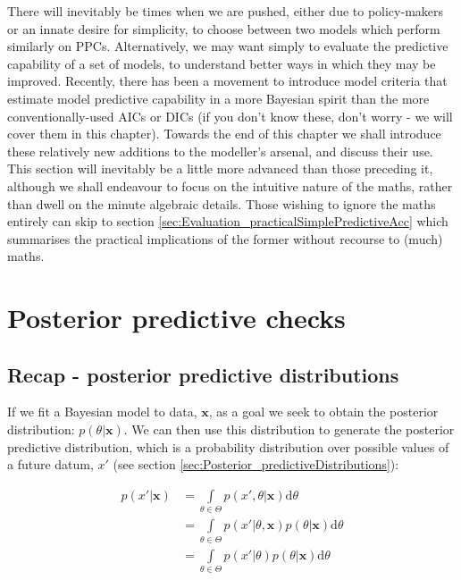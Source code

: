 \documentclass[11pt,fullpage]{book}
\begin{document}
There will inevitably be times when we are pushed, either due to policy-makers or an innate desire for simplicity, to choose between two models which perform similarly on PPCs. Alternatively, we may want simply to evaluate the predictive capability of a set of models, to understand better ways in which they may be improved. Recently, there has been a movement to introduce model criteria that estimate model predictive capability in a more Bayesian spirit than the more conventionally-used AICs or DICs (if you don't know these, don't worry - we will cover them in this chapter). Towards the end of this chapter we shall introduce these relatively new additions to the modeller's arsenal, and discuss their use. This section will inevitably be a little more advanced than those preceding it, although we shall endeavour to focus on the intuitive nature of the maths, rather than dwell on the minute algebraic details. Those wishing to ignore the maths entirely can skip to section \ref{sec:Evaluation_practicalSimplePredictiveAcc} which summarises the practical implications of the former without recourse to (much) maths.

\section{Posterior predictive checks}
\subsection{Recap - posterior predictive distributions}\label{sec:Evaluation_posteriorPredDist}
If we fit a Bayesian model to data, $\boldsymbol{x}$, as a goal we seek to obtain the posterior distribution: $p(\theta|\boldsymbol{x})$. We can then use this distribution to generate the posterior predictive distribution, which is a probability distribution over possible values of a future datum, $x'$ (see section \ref{sec:Posterior_predictiveDistributions}):

\begin{equation}\label{eq:Evaluation_posteriorPredictiveDistribution}
\begin{align}
p(x'|\boldsymbol{x}) &= \int\limits_{\theta\in\Theta} p(x',\theta|\boldsymbol{x}) \mathrm{d}\theta\\
&= \int\limits_{\theta\in\Theta} p(x'|\theta,\boldsymbol{x}) p(\theta|\boldsymbol{x}) \mathrm{d}\theta\\
&= \int\limits_{\theta\in\Theta} p(x'|\theta) p(\theta|\boldsymbol{x}) \mathrm{d}\theta
\end{align}
\end{equation}
\end{document}
